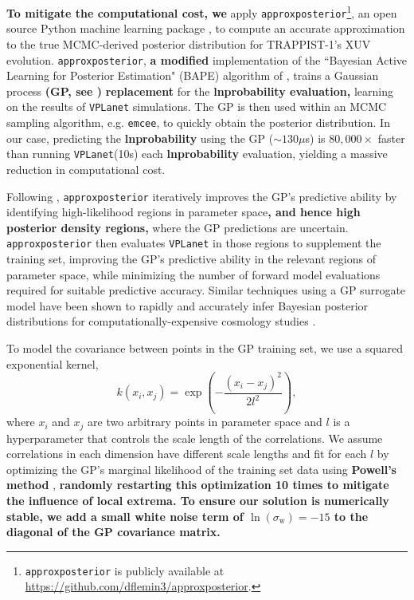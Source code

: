 \documentclass[twocolumn]{aastex62}
\newcommand{\xxx}[1]{{\textbf{#1}}}
\newcommand{\vplanet}[0]{\texttt{VPLanet}\xspace}
\newcommand{\emcee}[0]{\texttt{emcee}\xspace}
\newcommand{\approxposterior}[0]{\texttt{approxposterior}\xspace}
\begin{document}
\xxx{To mitigate the computational cost, we} apply \approxposterior\footnote{\approxposterior is publicly available at \href{https://github.com/dflemin3/approxposterior}{https://github.com/dflemin3/approxposterior}.}, an open source Python machine learning package \citep{FlemingVanderPlas2018}, to compute an accurate approximation to the true MCMC-derived posterior distribution for TRAPPIST-1's XUV evolution. \approxposterior, \xxx{a modified} implementation of the ``Bayesian Active Learning for Posterior Estimation" (BAPE) algorithm of \citet{Kandasamy2017}, trains a Gaussian process \xxx{(GP, see \citet{Rasmussen2006})} \xxx{replacement} for the \xxx{lnprobability evaluation,} learning on the results of \vplanet simulations. The GP is then used within an MCMC sampling algorithm, e.g. \emcee, to quickly obtain the posterior distribution. In our case, predicting the \xxx{lnprobability} using the GP (${\sim} 130 \mu$s) is $80,000 \times$ faster than running \vplanet (10s) each \xxx{lnprobability} evaluation, yielding a massive reduction in computational cost.

Following \citet{Kandasamy2017}, \approxposterior iteratively improves the GP's predictive ability by identifying high-likelihood regions in parameter space\xxx{, and hence high posterior density regions,} where the GP predictions are uncertain. \approxposterior then evaluates \vplanet in those regions to supplement the training set, improving the GP's predictive ability in the relevant regions of parameter space, while minimizing the number of forward model evaluations required for suitable predictive accuracy. Similar techniques using a GP surrogate model have been shown to rapidly and accurately infer Bayesian posterior distributions for computationally-expensive cosmology studies \citep[e.g.][]{Bird2019,McClintock2019}. 

To model the covariance between points in the GP training set, we use a squared exponential kernel,
\begin{equation} \label{eqn:kernel}
k(x_i, x_j) = \exp \left( - \frac{(x_i - x_j)^2}{2l^2} \right),
\end{equation}
where $x_i$ and $x_j$ are two arbitrary points in parameter space and $l$ is a hyperparameter that controls the scale length of the correlations. We assume correlations in each dimension have different scale lengths and fit for each $l$ by optimizing the GP's marginal likelihood of the training set data using \xxx{Powell's method} \citep{Powell1964}, \xxx{randomly restarting this optimization 10 times to mitigate the influence of local extrema. To ensure our solution is numerically stable, we add a small white noise term of $\ln(\sigma_{\mathrm{w}}) = -15$ to the diagonal of the GP covariance matrix.} 
\end{document}
